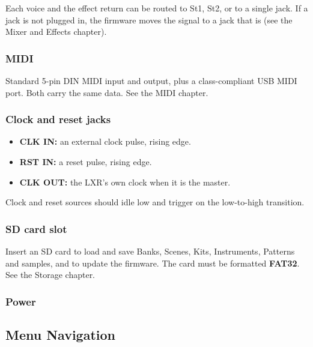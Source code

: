 Each voice and the effect return can be routed to St1, St2, or to a
single jack. If a jack is not plugged in, the firmware moves the signal
to a jack that is (see the Mixer and Effects chapter).


\subsubsection{MIDI}\label{midi}

Standard 5-pin DIN MIDI input and output, plus a class-compliant USB
MIDI port. Both carry the same data. See the MIDI chapter.

\subsubsection{Clock and reset jacks}\label{clock-and-reset-jacks}

\begin{itemize}
\tightlist
\item
  \textbf{CLK IN:} an external clock pulse, rising edge.
\item
  \textbf{RST IN:} a reset pulse, rising edge.
\item
  \textbf{CLK OUT:} the LXR's own clock when it is the master.
\end{itemize}

Clock and reset sources should idle low and trigger on the low-to-high
transition.

\subsubsection{SD card slot}\label{sd-card-slot}

Insert an SD card to load and save Banks, Scenes, Kits, Instruments,
Patterns and samples, and to update the firmware. The card must be
formatted \textbf{FAT32}. See the Storage chapter.

\subsubsection{Power}\label{power}


\subsection{Menu Navigation}\label{menu-navigation}

